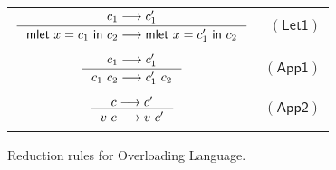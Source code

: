 \documentclass[preprint,authoryear,sort&compress,9pt,nocopyrightspace]{article}
\newcommand\rulename[1]{\mathsf{(#1)}}
\newcommand{\tto}{\longrightarrow}
\newcommand{\oletP}[3]{\mathsf{mlet} \ x = #2 \ \mathsf{in}  \ #3}
\newcommand{\semanticD}{Overloading Language}
\begin{document}
\begin{figure}
\begin{small}
\begin{center}
\begin{tabular}{|c r|}
$ \inference {c_1 \tto c_1'}{\oletP{T_1}{c_1}{c_2} \tto \oletP{T_1}{c_1'}{c_2} }$&$\rulename{Let1} $\\
&\\
$\inference {c_1 \tto c_1'}{c_1 \ c_2 \tto c_1' \ c_2} $&$\rulename{App1}  $\\
&\\
$ \inference {c \tto c'}{v \ c \tto v \ c'}$&$\rulename{App2}  $\\
&\\
\hline
\end{tabular}
\caption{Reduction rules for \semanticD.}
\label{tabla:rulesoverloadingsemantic}
\end{center}
\end{small}
\end{figure}

\begin{comment}
\begin{definition}[$\oplus$]
\label{definition:tcs}
\mbox{}
Given an environment  $s$ and a variable binding $x \mapsto (v_1:T_1)$, the operator $\oplus$ is defined  as follows:
\[ s \oplus x \mapsto (v_1:T_1) = \begin{cases} 
      x \mapsto \{(v_1:T_1)\}& s =  \varnothing \\
      x \mapsto \{(\overline{v : T})\} \cup \{(v_1 : T_1)\}, s' & s = x \mapsto \{(\overline{v : T})\}, s'\\
      y \mapsto \{(\overline{v : T})\}, s' \oplus x \mapsto (v_1:T_1) & s = y \mapsto \{(\overline{v : S})\}, s'\\
   \end{cases}
\]
\end{definition}
\end{comment}

\begin{comment}
\begin{definition}[$\oplus$]
\label{definition:tcs}
\mbox{}
Given an environment  $s$ and a variable binding $x \mapsto v_1$, the operator $\oplus$ is defined  as follows:
\[ s \oplus x \mapsto v_1 = \begin{cases} 
      x \mapsto \{v_1\}& s =  \varnothing \\
      x \mapsto \{\overline{v}\} \cup \{v_1\}, s' & s = x \mapsto \{\overline{v }\}, s'\\
      y \mapsto \{\overline{v}\}, s' \oplus x \mapsto v_1 & s = y \mapsto \{\overline{v}\}, s'\\
   \end{cases}
\]
\end{definition}
\end{comment}
\end{document}
